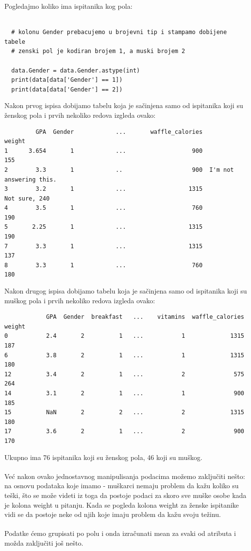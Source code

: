 \documentclass[12pt,a4paper]{article}
\begin{document}
Pogledajmo koliko ima ispitanika kog pola:
\begin{lstlisting}[mathescape=true]
  
  # kolonu Gender prebacujemo u brojevni tip i stampamo dobijene tabele
  # zenski pol je kodiran brojem 1, a muski brojem 2

  data.Gender = data.Gender.astype(int)
  print(data[data['Gender'] == 1])
  print(data[data['Gender'] == 2])

\end{lstlisting}
Nakon prvog ispisa dobijamo tabelu koja je sa\v cinjena samo od ispitanika koji su \v zenskog pola i prvih nekoliko redova izgleda ovako:
\begin{verbatim}
         GPA  Gender            ...       waffle_calories                    weight
1      3.654       1            ...                   900                       155
2        3.3       1            ..                    900  I'm not answering this.
3        3.2       1            ...                  1315             Not sure, 240
4        3.5       1            ...                   760                       190
5       2.25       1            ...                  1315                       190
7        3.3       1            ...                  1315                       137
8        3.3       1            ...                   760                       180
\end{verbatim}
Nakon drugog ispisa dobijamo tabelu koja je sa\v cinjena samo od ispitanika koji su mu\v skog pola i prvih nekoliko redova izgleda ovako:
\begin{verbatim}
            GPA  Gender  breakfast   ...    vitamins  waffle_calories  weight
0           2.4       2          1   ...           1             1315     187
6           3.8       2          1   ...           1             1315     180
12          3.4       2          1   ...           2              575     264
14          3.1       2          1   ...           1              900     185
15          NaN       2          2   ...           2             1315     180
17          3.6       2          1   ...           2              900     170
\end{verbatim}
Ukupno ima 76 ispitanika koji su \v zenskog pola, 46 koji su mu\v skog.
\\ \\
Ve\' c nakon ovako jednostavnog manipulisanja podacima mo\v zemo zaklju\v citi ne\v sto: \\
na osnovu podataka koje imamo - mu\v skarci nemaju problem da ka\v zu koliko su te\v ski, \v sto se mo\v ze videti iz toga da postoje podaci za skoro sve mu\v ske osobe kada je kolona weight u pitanju. Kada se pogleda kolona weight za \v zenske ispitanike vidi se da postoje neke od njih koje imaju problem da ka\v zu svoju te\v zinu.
\\ \\
Podatke \'cemo grupisati po polu i onda izra\v cunati mean za svaki od atributa i mo\v zda zaklju\v citi jo\v s ne\v sto.
\end{document}
